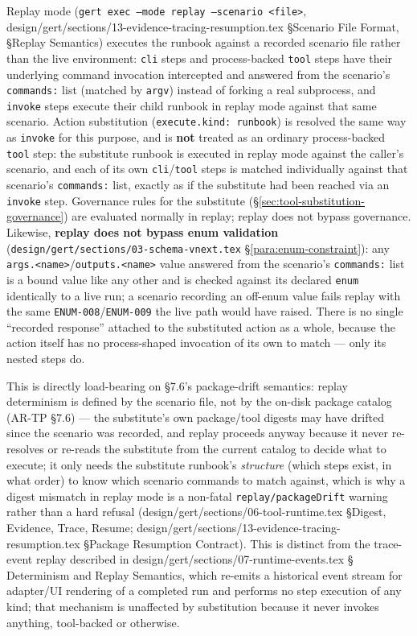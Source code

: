 Replay mode (\texttt{gert exec --mode replay --scenario <file>},
design/gert/sections/13-evidence-tracing-resumption.tex \S Scenario File
Format, \S Replay Semantics) executes the runbook against a recorded
scenario file rather than the live environment: \texttt{cli} steps and
process-backed \texttt{tool} steps have their underlying command
invocation intercepted and answered from the scenario's \texttt{commands:}
list (matched by \texttt{argv}) instead of forking a real subprocess, and
\texttt{invoke} steps execute their child runbook in replay mode against
that same scenario. Action substitution (\texttt{execute.kind: runbook})
is resolved the same way as \texttt{invoke} for this purpose, and is
\textbf{not} treated as an ordinary process-backed \texttt{tool} step:
the substitute runbook is executed in replay mode against the caller's
scenario, and each of its own \texttt{cli}/\texttt{tool} steps is matched
individually against that scenario's \texttt{commands:} list, exactly as
if the substitute had been reached via an \texttt{invoke} step. Governance
rules for the substitute (\S\ref{sec:tool-substitution-governance}) are
evaluated normally in replay; replay does not bypass governance. Likewise,
\textbf{replay does not bypass enum validation}
(\texttt{design/gert/sections/03-schema-vnext.tex} \S\ref{para:enum-constraint}):
any \texttt{args.<name>}/\texttt{outputs.<name>} value answered from the
scenario's \texttt{commands:} list is a bound value like any other and is
checked against its declared \texttt{enum} identically to a live run; a
scenario recording an off-enum value fails replay with the same
\texttt{ENUM-008}/\texttt{ENUM-009} the live path would have raised. There is
no single ``recorded response'' attached to the substituted action as a
whole, because the action itself has no process-shaped invocation of its
own to match --- only its nested steps do.

This is directly load-bearing on \S7.6's package-drift semantics: replay
determinism is defined by the scenario file, not by the on-disk package
catalog (AR-TP §7.6) --- the substitute's own package/tool digests may
have drifted since the scenario was recorded, and replay proceeds anyway
because it never re-resolves or re-reads the substitute from the current
catalog to decide what to execute; it only needs the substitute
runbook's \emph{structure} (which steps exist, in what order) to know
which scenario commands to match against, which is why a digest mismatch
in replay mode is a non-fatal \texttt{replay/packageDrift} warning rather
than a hard refusal (design/gert/sections/06-tool-runtime.tex \S Digest,
Evidence, Trace, Resume; design/gert/sections/13-evidence-tracing-resumption.tex
\S Package Resumption Contract). This is distinct from the trace-event
replay described in design/gert/sections/07-runtime-events.tex \S
Determinism and Replay Semantics, which re-emits a historical event
stream for adapter/UI rendering of a completed run and performs no step
execution of any kind; that mechanism is unaffected by substitution
because it never invokes anything, tool-backed or otherwise.

